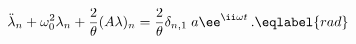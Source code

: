 \begin{equation}
\ddot\lambda_n + \omega_0^2\lambda_n + \frac 2\theta (A\lambda)_n=
\frac2\theta\delta_{n,1}\; a \ee^{\ii\omega t} \,.
\eqlabel{rad}
\end{equation}

